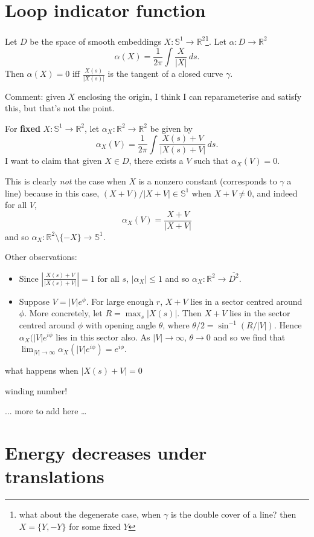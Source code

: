 \documentclass[12pt, a4paper]{amsart}
\theoremstyle{remark}
\newcommand{\R}{\mathbb{R}}
\newcommand{\So}{\mathbb{S}^1}
\begin{document}
\section*{Loop indicator function}
Let $D$ be the space of smooth embeddings $X:\So\to\R^2$\footnote{what about the degenerate case, when $\gamma$ is the double cover of a line?  then $X=\lbrace Y,-Y\rbrace$ for some fixed $Y$}.
Let $\alpha: D\to \R^2$
$$ \alpha(X)=\frac1{2\pi}\int  \frac{X}{|X|}\,ds.$$
Then $\alpha(X)=0$ iff $\frac{X(s)}{|X(s)|}$ is the tangent of a closed curve $\gamma$.

Comment:   given $X$ enclosing the origin, I think I can reparameterise and satisfy this, but that's not the point.

For \textbf{fixed} $X:\So\to \R^2$, let $\alpha_X:\mathbb{R}^2\rightarrow \R^2$
be given by 
$$ \alpha_X(V)= \frac1{2\pi} \int  \frac{X(s)+V}{|X(s)+V|}\,ds.$$
I want to claim that given $X\in D$, there exists a $V$ such that $\alpha_X(V)=0$.  

This is clearly \emph{not} the case when $X$ is a nonzero constant (corresponds to $\gamma$ a line) because in this case, $(X+V)/|X+V|\in \So$ when $X+V\not=0$, and indeed for all $V$, 
$$\alpha_X(V)=\frac{X+V}{|X+V|}$$
and so $\alpha_X:\R^2\setminus\lbrace -X\rbrace \to \So$.

Other observations:   
\begin{itemize}
\item Since $\left| \frac{X(s)+V}{|X(s)+V|}\right|=1$ for all $s$,   $|\alpha_X|\le 1$ and so $\alpha_X:\mathbb{R}^2\rightarrow \overline{D^2}$.    
\item Suppose $V=|V|e^\phi$.    For large enough $r$, $X+V$ lies in a sector centred around $\phi$.      More concretely, let $R=\max_s |X(s)|$.   Then $X+V$ lies in the sector centred around $\phi$ with opening angle $\theta$, where $\theta/2=\sin^{-1}(R/|V|)$.   Hence $\alpha_X(|V|e^{i\phi}$ lies in this sector also.    As $|V|\rightarrow\infty$, $\theta\to 0$ and so we find that $\lim_{|V|\rightarrow\infty } \alpha_X(|V|e^{i\phi})=e^{i\phi}$.   
\end{itemize}



what happens when $|X(s)+V|=0$

winding number!

... more to add here \dots

\newpage

\section*{Energy decreases under translations}
\end{document}
